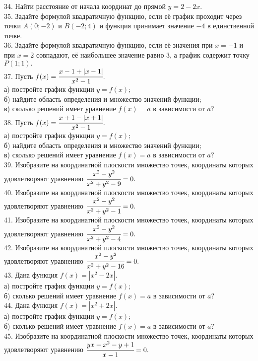 34. Найти расстояние от начала координат до прямой $y=2-2x.$\\
35. Задайте формулой квадратичную функцию, если её график проходит через точки $A(0;-2)$ и $B(-2;4)$ и функция принимает значение $-4$ в единственной точке.\\
36. Задайте формулой квадратичную функцию, если её значения при $x=-1$ и при $x=2$ совпадают, её наибольшее значение равно 3, а график содержит точку $P(1;1).$\\
37. Пусть $f(x)=\cfrac{x-1+|x-1|}{x^2-1}.$\\
а) постройте график функции $y=f(x);$\\
б) найдите область определения и множество значений функции;\\
в) сколько решений имеет уравнение $f(x)=a$ в зависимости от $a?$\\
38. Пусть $f(x)=\cfrac{x+1-|x+1|}{x^2-1}.$\\
а) постройте график функции $y=f(x);$\\
б) найдите область определения и множество значений функции;\\
в) сколько решений имеет уравнение $f(x)=a$ в зависимости от $a?$\\
39. Изобразите на координатной плоскости множество точек, координаты которых удовлетворяют уравнению $\cfrac{x^2-y^2}{x^2+y^2-9}=0.$\\
40. Изобразите на координатной плоскости множество точек, координаты которых удовлетворяют уравнению $\cfrac{x^2-y^2}{x^2+y^2-1}=0.$\\
41. Изобразите на координатной плоскости множество точек, координаты которых удовлетворяют уравнению $\cfrac{x^2-y^2}{x^2+y^2-4}=0.$\\
42. Изобразите на координатной плоскости множество точек, координаты которых удовлетворяют уравнению $\cfrac{x^2-y^2}{x^2+y^2-16}=0.$\\
43. Дана функция $f(x)=|x^2-2x|.$\\
а) постройте график функции $y=f(x);$\\
б) сколько решений имеет уравнение $f(x)=a$ в зависимости от $a?$\\
44. Дана функция $f(x)=|x^2+2x|.$\\
а) постройте график функции $y=f(x);$\\
б) сколько решений имеет уравнение $f(x)=a$ в зависимости от $a?$\\
45. Изобразите на координатной плоскости множество точек, координаты которых удовлетворяют уравнению $\cfrac{yx-x^2-y+1}{x-1}=0.$\\
